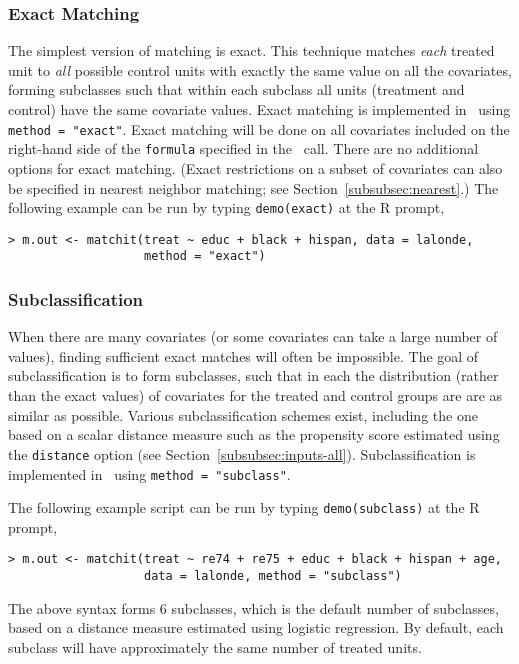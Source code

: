 \subsubsection{Exact Matching}
\label{subsubsec:exact}

The simplest version of matching is exact.  This technique matches
\emph{each} treated unit to \emph{all} possible control units with
exactly the same value on all the covariates, forming subclasses such
that within each subclass all units (treatment and control) have the
same covariate values.  Exact matching is implemented in \MatchIt\ 
using \texttt{method = "exact"}.  Exact matching will be done on all
covariates included on the right-hand side of the \texttt{formula}
specified in the \MatchIt\ call.  There are no additional options for
exact matching.  (Exact restrictions on a subset of covariates can
also be specified in nearest neighbor matching; see
Section~\ref{subsubsec:nearest}.)  The following example can be
run by typing {\tt demo(exact)} at the R prompt,
\begin{verbatim}
> m.out <- matchit(treat ~ educ + black + hispan, data = lalonde, 
                   method = "exact")
\end{verbatim}

\subsubsection{Subclassification}
\label{subsubsec:subclass}

When there are many covariates (or some covariates can take a large
number of values), finding sufficient exact matches will often be
impossible.  The goal of subclassification is to form subclasses, such
that in each the distribution (rather than the exact values) of
covariates for the treated and control groups are are as similar as
possible.  Various subclassification schemes exist, including the one
based on a scalar distance measure such as the propensity score
estimated using the \texttt{distance} option (see
Section~\ref{subsubsec:inputs-all}).  Subclassification is implemented
in \MatchIt\ using \texttt{method = "subclass"}.

The following example script can be run by typing {\tt demo(subclass)}
at the R prompt,
\begin{verbatim}
> m.out <- matchit(treat ~ re74 + re75 + educ + black + hispan + age, 
                   data = lalonde, method = "subclass")
\end{verbatim}
The above syntax forms 6 subclasses, which is the default number
of subclasses, based on a distance measure estimated using logistic
regression.  By default, each subclass will have approximately the
same number of treated units.

